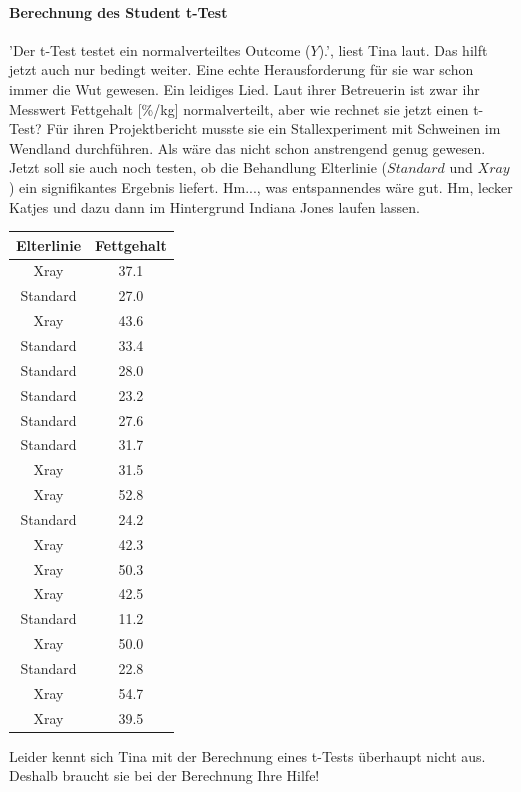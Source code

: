 \documentclass[a4paper, 9pt]{scrartcl}\usepackage[]{graphicx}\usepackage[]{xcolor}
\begin{document}
\paragraph{Berechnung des Student t-Test}

'Der t-Test testet ein normalverteiltes Outcome ($Y$).', liest Tina laut. Das hilft jetzt auch nur bedingt weiter. Eine echte Herausforderung für sie war schon immer die Wut gewesen. Ein leidiges Lied. Laut ihrer Betreuerin ist zwar ihr Messwert Fettgehalt [\%/kg] normalverteilt, aber wie rechnet sie jetzt einen t-Test? Für ihren Projektbericht musste sie ein Stallexperiment mit Schweinen im Wendland durchführen. Als wäre das nicht schon anstrengend genug gewesen. Jetzt soll sie auch noch testen, ob die Behandlung Elterlinie ($Standard$ und $Xray$) ein signifikantes Ergebnis liefert. Hm..., was entspannendes wäre gut. Hm, lecker Katjes und dazu dann im Hintergrund Indiana Jones laufen lassen.

\begin{table}[!h]
\centering
\begin{tabular}{cc}
\toprule
Elterlinie & Fettgehalt\\
\midrule
Xray & 37.1\\
Standard & 27.0\\
Xray & 43.6\\
Standard & 33.4\\
Standard & 28.0\\
\addlinespace
Standard & 23.2\\
Standard & 27.6\\
Standard & 31.7\\
Xray & 31.5\\
Xray & 52.8\\
\addlinespace
Standard & 24.2\\
Xray & 42.3\\
Xray & 50.3\\
Xray & 42.5\\
Standard & 11.2\\
\addlinespace
Xray & 50.0\\
Standard & 22.8\\
Xray & 54.7\\
Xray & 39.5\\
\bottomrule
\end{tabular}
\end{table}



Leider kennt sich Tina mit der Berechnung eines t-Tests überhaupt nicht aus. Deshalb braucht sie bei der Berechnung Ihre Hilfe!
\end{document}

